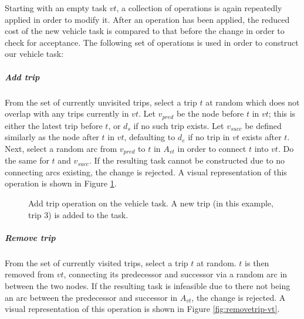 \documentclass[]{article}
\begin{document}
Starting with an empty task $vt$, a collection of operations is again repeatedly applied in order to modify it. After an operation has been applied, the reduced cost of the new vehicle task is compared to that before the change in order to check for acceptance. The following set of operations is used in order to construct our vehicle task: 

\subparagraph{Add trip} From the set of currently unvisited trips, select a trip $t$ at random which does not overlap with any trips currently in $vt$. Let $v_{pred}$ be the node before $t$ in $vt$; this is either the latest trip before $t$, or $d_s$ if no such trip exists. Let $v_{succ}$ be defined similarly as the node after $t$ in $vt$, defaulting to $d_e$ if no trip in $vt$ exists after $t$. Next, select a random arc from $v_{pred}$ to $t$ in $A_{vt}$ in order to connect $t$ into $vt$. Do the same for $t$ and $v_{succ}$. If the resulting task cannot be constructed due to no connecting arcs existing, the change is rejected. A visual representation of this operation is shown in Figure \ref{fig:addtrip-vt}.

\begin{figure}[h]
  \centering
  \caption{Add trip operation on the vehicle task. A new trip (in this example, trip 3) is added to the task.}
  \label{fig:addtrip-vt}
\end{figure}

\subparagraph{Remove trip} From the set of currently visited trips, select a trip $t$ at random. $t$ is then removed from $vt$, connecting its predecessor and successor via a random arc in  between the two nodes. If the resulting task is infeasible due to there not being an arc between the predecessor and successor in $A_{vt}$, the change is rejected. A visual representation of this operation is shown in Figure \ref{fig:removetrip-vt}.
\end{document}
